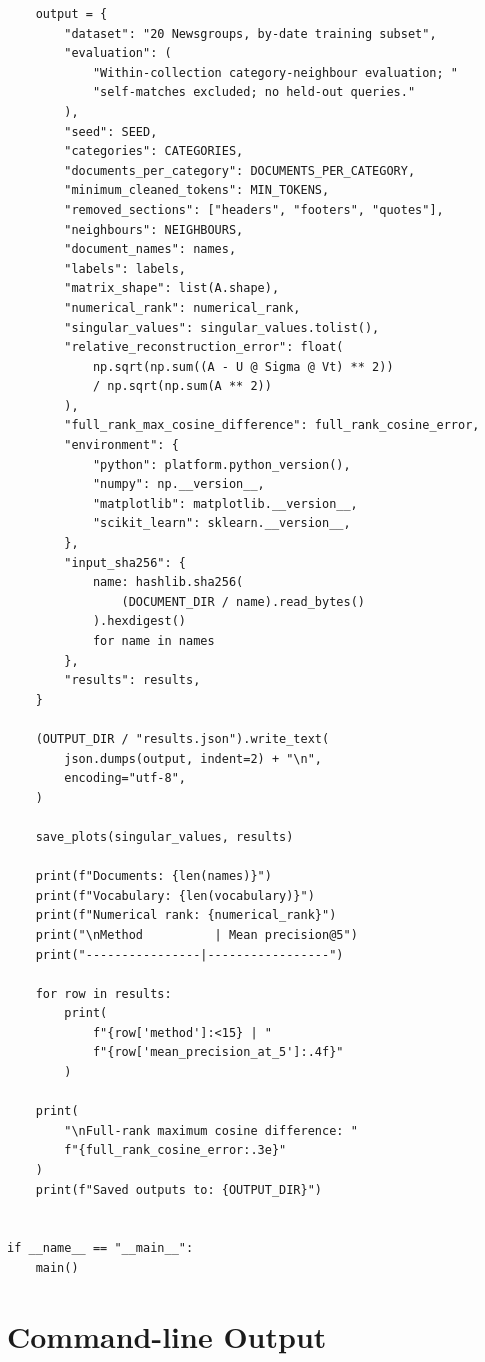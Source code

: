 \documentclass[12pt,a4paper]{report}
\theoremstyle{plain}
\theoremstyle{definition}
\theoremstyle{remark}
\theoremstyle{definition}
\begin{document}
\begin{lstlisting}
    output = {
        "dataset": "20 Newsgroups, by-date training subset",
        "evaluation": (
            "Within-collection category-neighbour evaluation; "
            "self-matches excluded; no held-out queries."
        ),
        "seed": SEED,
        "categories": CATEGORIES,
        "documents_per_category": DOCUMENTS_PER_CATEGORY,
        "minimum_cleaned_tokens": MIN_TOKENS,
        "removed_sections": ["headers", "footers", "quotes"],
        "neighbours": NEIGHBOURS,
        "document_names": names,
        "labels": labels,
        "matrix_shape": list(A.shape),
        "numerical_rank": numerical_rank,
        "singular_values": singular_values.tolist(),
        "relative_reconstruction_error": float(
            np.sqrt(np.sum((A - U @ Sigma @ Vt) ** 2))
            / np.sqrt(np.sum(A ** 2))
        ),
        "full_rank_max_cosine_difference": full_rank_cosine_error,
        "environment": {
            "python": platform.python_version(),
            "numpy": np.__version__,
            "matplotlib": matplotlib.__version__,
            "scikit_learn": sklearn.__version__,
        },
        "input_sha256": {
            name: hashlib.sha256(
                (DOCUMENT_DIR / name).read_bytes()
            ).hexdigest()
            for name in names
        },
        "results": results,
    }

    (OUTPUT_DIR / "results.json").write_text(
        json.dumps(output, indent=2) + "\n",
        encoding="utf-8",
    )

    save_plots(singular_values, results)

    print(f"Documents: {len(names)}")
    print(f"Vocabulary: {len(vocabulary)}")
    print(f"Numerical rank: {numerical_rank}")
    print("\nMethod          | Mean precision@5")
    print("----------------|-----------------")

    for row in results:
        print(
            f"{row['method']:<15} | "
            f"{row['mean_precision_at_5']:.4f}"
        )

    print(
        "\nFull-rank maximum cosine difference: "
        f"{full_rank_cosine_error:.3e}"
    )
    print(f"Saved outputs to: {OUTPUT_DIR}")


if __name__ == "__main__":
    main()
\end{lstlisting}

\chapter{Command-line Output}
\end{document}
